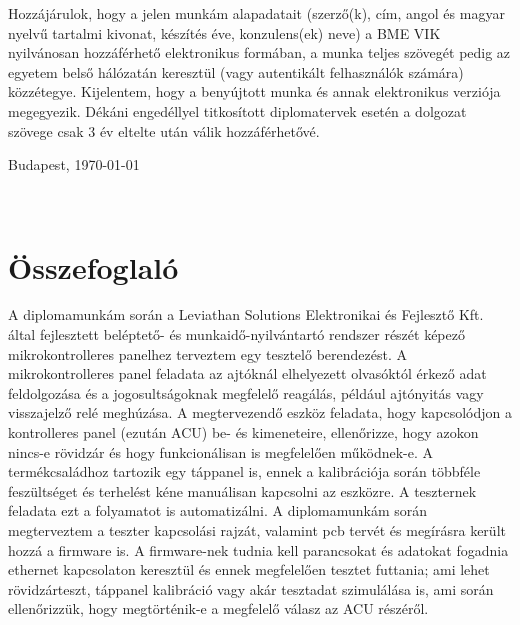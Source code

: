 \documentclass[a4paper, 12pt]{article}
\begin{document}
Hozzájárulok, hogy a jelen munkám alapadatait (szerző(k), cím, angol és magyar nyelvű tartalmi kivonat, készítés éve, konzulens(ek) neve) a BME VIK nyilvánosan hozzáférhető elektronikus formában, a munka teljes szövegét pedig az egyetem belső hálózatán keresztül (vagy autentikált felhasználók számára) közzétegye. Kijelentem, hogy a benyújtott munka és annak elektronikus verziója megegyezik. Dékáni engedéllyel titkosított diplomatervek esetén a dolgozat szövege csak 3 év eltelte után válik hozzáférhetővé.

\begin{flushleft}
\vspace*{1cm}
Budapest, \today
\end{flushleft}

\begin{flushright}
 \vspace*{1cm}
 \makebox[7cm]{\rule{6cm}{.4pt}}\\
\end{flushright}


\thispagestyle{empty} %
\vfill
\clearpage

\section*{Összefoglaló}
A diplomamunkám során a Leviathan Solutions Elektronikai és Fejlesztő Kft. által fejlesztett beléptető- és munkaidő-nyilvántartó rendszer részét képező mikrokontrolleres panelhez terveztem egy tesztelő berendezést. A mikrokontrolleres panel feladata az ajtóknál elhelyezett olvasóktól érkező adat feldolgozása és a jogosultságoknak megfelelő reagálás, például ajtónyitás vagy visszajelző relé meghúzása. A megtervezendő eszköz feladata, hogy kapcsolódjon a kontrolleres panel (ezután ACU) be- és kimeneteire, ellenőrizze, hogy azokon nincs-e rövidzár és hogy funkcionálisan is megfelelően működnek-e. A termékcsaládhoz tartozik egy táppanel is, ennek a kalibrációja során többféle feszültséget és terhelést kéne manuálisan kapcsolni az eszközre. A teszternek feladata ezt a folyamatot is automatizálni. A diplomamunkám során megterveztem a teszter kapcsolási rajzát, valamint pcb tervét és megírásra került hozzá a firmware is. A firmware-nek tudnia kell parancsokat és adatokat fogadnia ethernet kapcsolaton keresztül és ennek megfelelően tesztet futtania; ami lehet rövidzárteszt, táppanel kalibráció vagy akár tesztadat szimulálása is, ami során ellenőrizzük, hogy megtörténik-e a megfelelő válasz az ACU részéről.
\end{document}
